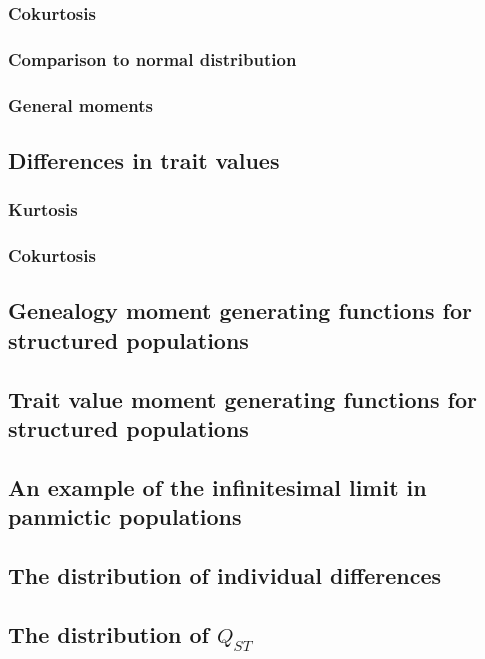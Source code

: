 \documentclass{article}
\begin{document}
\subsubsection{Cokurtosis}

\subsubsection{Comparison to normal distribution}

\subsubsection{General moments}

\subsection{Differences in trait values}
\subsubsection{Kurtosis}

\subsubsection{Cokurtosis}

\subsection{Genealogy moment generating functions for structured populations}

\subsection{Trait value moment generating functions for structured populations}

\subsection{An example of the infinitesimal limit in panmictic populations}

\subsection{The distribution of individual differences}

\subsection{The distribution of $Q_{ST}$}


\clearpage


\end{document}
